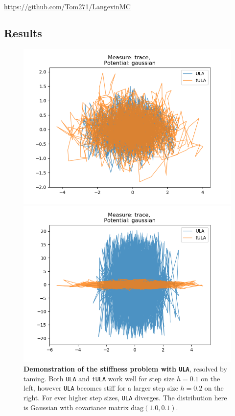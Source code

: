    \centerline{ \url{https://github.com/Tom271/LangevinMC}}


\subsection{Results}

\begin{figure}[H]
\centering
  \begin{minipage}[b]{0.49\textwidth}
  \centering
    \includegraphics[width=\textwidth]{Figures/ula_tula_step_01.png}
  \end{minipage} %
  \begin{minipage}[b]{0.49\textwidth}
  \centering
    \includegraphics[width=\textwidth]{Figures/ula_tula_step_02.png}
  \end{minipage}
   \caption{\textbf{Demonstration of the stiffness problem with \texttt{ULA}}, resolved by taming. Both \texttt{ULA} and \texttt{tULA} work well for step size $h = 0.1$ on the left, however \texttt{ULA} becomes stiff for a larger step size $h = 0.2$ on the right. For ever higher step sizes, \texttt{ULA} diverges. The distribution here is Gaussian with covariance matrix $\text{diag}(1.0, 0.1)$.}
\end{figure}

